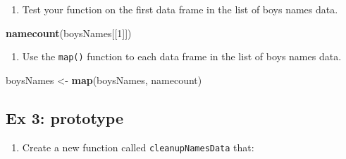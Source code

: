 \documentclass[
]{book}
\newenvironment{Shaded}{\begin{snugshade}}{\end{snugshade}}
\newcommand{\DecValTok}[1]{\textcolor[rgb]{0.00,0.00,0.81}{#1}}
\newcommand{\KeywordTok}[1]{\textcolor[rgb]{0.13,0.29,0.53}{\textbf{#1}}}
\newcommand{\NormalTok}[1]{#1}
\newcommand{\StringTok}[1]{\textcolor[rgb]{0.31,0.60,0.02}{#1}}
\providecommand{\tightlist}{%
  \setlength{\itemsep}{0pt}\setlength{\parskip}{0pt}}
\begin{document}
\begin{enumerate}
\def\labelenumi{\arabic{enumi}.}
\setcounter{enumi}{1}
\tightlist
\item
  Test your function on the first data frame in the list of boys names data.
\end{enumerate}

\begin{Shaded}
\begin{Highlighting}[]
  \KeywordTok{namecount}\NormalTok{(boysNames[[}\DecValTok{1}\NormalTok{]])}
\end{Highlighting}
\end{Shaded}

\begin{enumerate}
\def\labelenumi{\arabic{enumi}.}
\setcounter{enumi}{2}
\tightlist
\item
  Use the \texttt{map()} function to each data frame in the list of boys names data.
\end{enumerate}

\begin{Shaded}
\begin{Highlighting}[]
\NormalTok{  boysNames <-}\StringTok{ }\KeywordTok{map}\NormalTok{(boysNames, namecount)}
\end{Highlighting}
\end{Shaded}

\hypertarget{ex-3-prototype-3}{%
\subsection{Ex 3: prototype}\label{ex-3-prototype-3}}

\begin{enumerate}
\def\labelenumi{\arabic{enumi}.}
\tightlist
\item
  Create a new function called \texttt{cleanupNamesData} that:
\end{enumerate}
\end{document}
